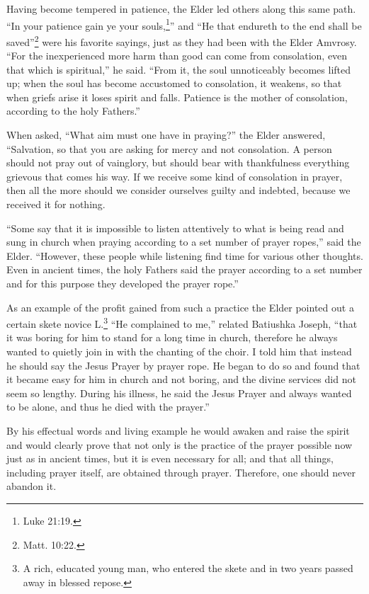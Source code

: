 Having become tempered in patience, the Elder led others along this same path. ``In your patience gain ye your souls,\footnote{Luke 21:19.}'' and ``He that endureth to the end shall be saved''\footnote{Matt. 10:22.} were his favorite sayings, just as they had been with the Elder Amvrosy. ``For the inexperienced more harm than good can come from consolation, even that which is spiritual,'' he said. ``From it, the soul unnoticeably becomes lifted up; when the soul has become accustomed to consolation, it weakens, so that when griefs arise it loses spirit and falls. Patience is the mother of consolation, according to the holy Fathers.''

When asked, ``What aim must one have in praying?'' the Elder answered, ``Salvation, so that you are asking for mercy and not consolation. A person should not pray out of vainglory, but should bear with thankfulness everything grievous that comes his way. If we receive some kind of consolation in prayer, then all the more should we consider ourselves guilty and indebted, because we received it for nothing.

``Some say that it is impossible to listen attentively to what is being read and sung in church when praying according to a set number of prayer ropes,'' said the Elder. ``However, these people while listening find time for various other thoughts. Even in ancient times, the holy Fathers said the prayer according to a set number and for this purpose they developed the prayer rope.''

As an example of the profit gained from such a practice the Elder pointed out a certain skete novice L.\footnote{A rich, educated young man, who entered the skete and in two years passed away in blessed repose.} ``He complained to me,'' related Batiushka Joseph, ``that it was boring for him to stand for a long time in church, therefore he always wanted to quietly join in with the chanting of the choir. I told him that instead he should say the Jesus Prayer by prayer rope. He began to do so and found that it became easy for him in church and not boring, and the divine services did not seem so lengthy. During his illness, he said the Jesus Prayer and always wanted to be alone, and thus he died with the prayer.''

By his effectual words and living example he would awaken and raise the spirit and would clearly prove that not only is the practice of the prayer possible now just as in ancient times, but it is even necessary for all; and that all things, including prayer itself, are obtained through prayer. Therefore, one should never abandon it.

